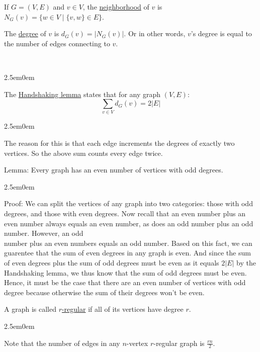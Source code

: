 \documentclass{book}
\newcommand{\hOneOld}{%
   \color{Black}%
   \fontsize{14}{14}\selectfont%
}
\newcommand{\hTwoOldd}{%
   \color{MidnightBlue}%
   \fontsize{13}{13}\selectfont%
}
\newcommand{\hThreeOld}{%
   \color{PineGreen}
   \fontsize{13}{13}\selectfont%
}
\newenvironment{myIndent}{%
   \begin{adjustwidth}{2.5em}{0em}%
}{%
   \end{adjustwidth}%
}
\newcommand{\udefine}[1]{%
   \setulcolor{Red}%
   \setul{0.14em}{0.07em}%
   \ul{#1}%
}
\newcommand{\uuline}[2][.]{%
{\vphantom{a}\color{#1}%
\rlap{\rule[-0.18em]{\widthof{#2}}{0.06em}}%
\rlap{\rule[-0.32em]{\widthof{#2}}{0.06em}}}%
#2}
\newcommand{\mySepTwo}[1][.]{%
   {\noindent\color{#1}{\rule{6.5in}{0.5mm}}}\\%
}
\begin{document}
\newpage
\hOneOld
If $G = (V, E)$ and $v \in V$, the \udefine{neighborhood} of $v$ is
$N_{G}(v)=\{w \in V \mid \{v, w\} \in E\}$. \bigbreak

The \udefine{degree} of $v$ is $d_{G}(v) = \lvert N_{G}(v) \rvert$.
Or in other words, $v$'s degree is equal to the number of edges 
connecting to $v$.

\mySepTwo[MidnightBlue]
\hTwoOldd
\begin{myIndent}
   The \udefine{Handshaking lemma} states that for any graph $(V, E)$:
      {\fontsize{16}{15}\selectfont
      \[ \sum_{v \in V} d_{G}(v) = 2 \lvert E \rvert \]}
   
   \hThreeOld
   \begin{myIndent}
      The reason for this is that each edge increments the degrees of
      exactly two vertices. So the above sum counts every edge twice.
      \hfill \bigbreak
   \end{myIndent}

   \hTwoOldd
   \uuline{Lemma}: Every graph has an even number of vertices with odd
   degrees.

   \hThreeOld
   \begin{myIndent}
      Proof: We can split the vertices of any graph into two categories:
      those with odd degrees, and those with even degrees.
      \hfill \bigbreak
      Now recall that an even number plus an even number always equals
      an even number, as does an odd number plus an odd number. However,
      an odd\\ number plus an even numbers equals an odd number. Based on
      this fact, we can guarentee that the sum of even degrees in any
      graph is even. And since the sum of even degrees plus the sum of 
      odd degrees must be even as it equals $2 \lvert E \rvert$ by
      the Handshaking lemma, we thus know that the sum of odd degrees 
      must be even. Hence, it must be the case that there are an even 
      number of vertices with odd degree because otherwise the sum of 
      their degrees won't be even.
      \hfill \bigbreak
   \end{myIndent}

   \hTwoOldd
   A graph is called \udefine{$r$-regular} if all of its vertices have
   degree $r$.
   \hThreeOld
   \begin{myIndent}
      Note that the number of edges in any $n$-vertex $r$-regular graph is
      $ \displaystyle{\frac{rn}{2}}$.
      \hfill \bigbreak
   \end{myIndent}
   

\end{myIndent}
\end{document}
